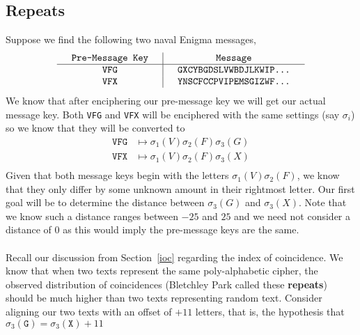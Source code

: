   \subsection{Repeats}
  Suppose we find the following two naval Enigma messages,
  \[
    \setlength{\arraycolsep}{15pt}
    \begin{array}{c | c}
      \texttt{Pre-Message Key} & \texttt{Message}                \\
      \hline
      \texttt{VFG}             & \texttt{GXCYBGDSLVWBDJLKWIP...} \\
      \texttt{VFX}             & \texttt{YNSCFCCPVIPEMSGIZWF...} \\
    \end{array}
  \]
  We know that after enciphering our pre-message key we will get our
  actual message key. Both \texttt{VFG} and \texttt{VFX} will be
  enciphered with the same settings (say $\sigma_i$) so we know that
  they will be converted to
  \begin{align*}
    \texttt{VFG} & \mapsto \sigma_1(V)\sigma_2(F)\sigma_3(G) \\
    \texttt{VFX} & \mapsto \sigma_1(V)\sigma_2(F)\sigma_3(X) \\
  \end{align*}
  Given that both message keys begin with the letters
  $\sigma_1(V)\sigma_2(F)$, we know that they only differ by some
  unknown amount in their rightmost letter. Our first goal will be to
  determine the distance between $\sigma_3(G)$ and $\sigma_3(X)$.
  Note that we know such a distance ranges between $-25$ and $25$ and
  we need not consider a distance of $0$ as this would imply the
  pre-message keys are the same.
  \\\\Recall our discussion from Section~\ref{ioc} regarding the
  index of coincidence. We know that when two texts represent the
  same poly-alphabetic cipher, the observed distribution of coincidences
  (Bletchley Park called these {\bf{repeats}}) should be much higher
  than two texts representing random text. Consider aligning our two
  texts with an offset of $+11$ letters, that is, the hypothesis that
  $\sigma_3(\texttt{G}) = \sigma_3(\texttt{X}) + 11$
  \begin{center}
  \end{center}
